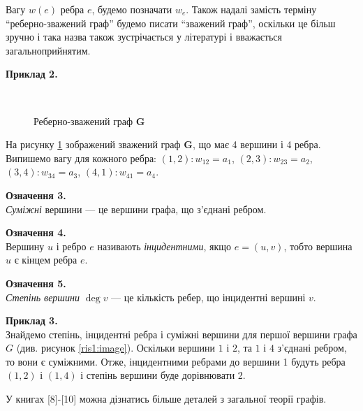   Вагу $w(e)$ ребра $e$, будемо позначати $w_e$. Також надалі замість терміну ``реберно-зважений граф'' будемо писати ``зважений граф'', оскільки це більш зручно і така назва також зустрічається у літературі і вважається загальноприйнятим. 
  
\textbf{Приклад 2.}
 \begin{figure}[H]{}
    \centering
    \\
    \caption{Реберно-зважений граф \textbf{G}}
    \label{ris2:image}
\end{figure}

На рисунку \ref{ris2:image} зображений зважений граф \textbf{G}, що має 4 вершини і 4 ребра. Випишемо вагу для кожного ребра: $(1,2):w_{12} = a_1$,  $(2,3):w_{23} = a_2$,  $(3,4):w_{34} = a_3$,  $(4,1):w_{41} = a_4$.


 \textbf{Означення 3.}\\
 \emph{Суміжні} вершини --- це вершини графа, що з’єднані ребром.
  
  \textbf{Означення 4.}\\
  Вершину $u$ і ребро $e$ називають \emph{інцидентними}, якщо $e = (u,v)$, тобто вершина $u$ є кінцем ребра $e$.
 
  \textbf{Означення 5.}\\
\textit{Степінь вершини $\deg v$} --- це кількість ребер, що інцидентні вершині $v$.
 
\textbf{Приклад 3.}\\
Знайдемо степінь, інцидентні ребра і суміжні вершини для першої вершини графа $G$ (див. рисунок \ref{ris1:image}).
Оскільки вершини  $1$ і $2$, та $1$ і $4$ з'єднані ребром, то вони є суміжними. Отже, інцидентними ребрами до вершини 1 будуть ребра $(1,2)$ і $(1,4)$ і степінь вершини буде дорівнювати 2.

У книгах [8]-[10] можна дізнатись більше деталей з загальної теорії графів.